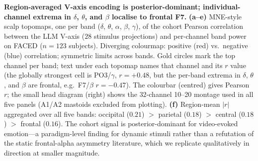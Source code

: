 \textbf{Region-averaged V-axis encoding is posterior-dominant; individual-channel
extrema in $\delta$, $\theta$, and $\beta$ localise to frontal F7.}
\textbf{(a--e)} MNE-style scalp topomaps, one per band ($\delta$,
$\theta$, $\alpha$, $\beta$, $\gamma$), of the cohort Pearson
correlation between the LLM V-axis ($28$ stimulus projections) and
per-channel band power on FACED ($n{=}123$ subjects). Diverging
colourmap: positive (red) vs.\ negative (blue) correlation; symmetric
limits across bands. Gold circles mark the top channel per band;
text under each topomap names that channel and its $r$ value (the
globally strongest cell is PO3/$\gamma$, $r{=}{+}0.48$, but the per-band
extrema in $\delta$, $\theta$, and $\beta$ are frontal, e.g.\ F7/$\beta$
$r{=}{-}0.47$). The colourbar (centred)
gives Pearson $r$; the small head diagram (right) shows the
$32$-channel 10--20 montage used in all five panels (A1/A2 mastoids
excluded from plotting). \textbf{(f)} Region-mean $|r|$ aggregated
over all five bands: occipital ($0.21$) $>$ parietal ($0.18$) $>$
central ($0.18$) $>$ frontal ($0.16$). The cohort signal is
posterior-dominant for video-evoked emotion---a paradigm-level
finding for dynamic stimuli rather than a refutation of the static
frontal-alpha asymmetry literature, which we replicate qualitatively
in direction at smaller magnitude.
